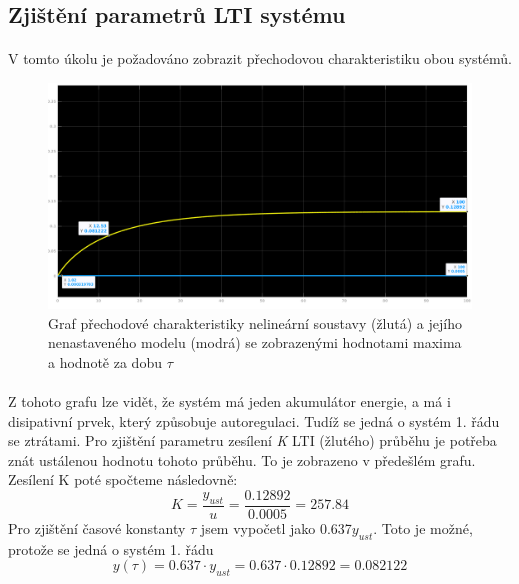 \documentclass{article}
\begin{document}
		\subsection{Zjištění parametrů LTI systému}
		\paragraph{}
		V tomto úkolu je požadováno zobrazit přechodovou charakteristiku obou systémů.
		
   	
   		\begin{figure}[H]
   			\includegraphics[width = \textwidth]{ukol2meas1}
   			\caption{Graf přechodové charakteristiky nelineární soustavy (žlutá) a jejího nenastaveného modelu (modrá) se zobrazenými hodnotami maxima a hodnotě za dobu $\tau$}
	   	\end{figure}
   	
		\paragraph{}
		   	Z tohoto grafu lze vidět, že systém má jeden akumulátor energie, a má i disipativní prvek, který způsobuje autoregulaci. Tudíž se jedná o systém 1. řádu se ztrátami. 
		   	\indent Pro zjištění parametru zesílení \textit{K} LTI (žlutého) průběhu je potřeba znát ustálenou hodnotu tohoto průběhu. To je zobrazeno v předešlém grafu. Zesílení K poté spočteme následovně:
		   	\begin{equation}
		   	\label{eqn:gain}
		   	K = \frac{y_{ust}}{u} = \frac{0.12892}{0.0005} = 257.84
		   	\end{equation}
   	\indent Pro zjištění časové konstanty $\tau$ jsem vypočetl jako 0.637$y_{ust}$. Toto je možné, protože se jedná o systém 1. řádu
   			\begin{equation}
   			\label{eqn:tau}
   			y(\tau) = 0.637 \cdot y_{ust} = 0.637 \cdot 0.12892 = 0.082122
   			\end{equation}
   			
\end{document}

